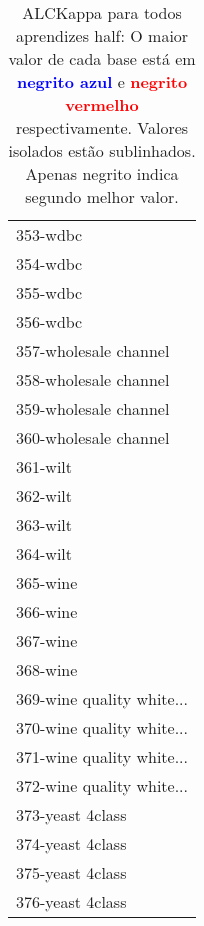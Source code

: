 \begin{table}[h]
\caption{ALCKappa para todos aprendizes half: O maior valor de cada base está em \textcolor{blue}{\textbf{negrito azul}} e \textcolor{red}{\textbf{negrito vermelho}} respectivamente. Valores isolados estão sublinhados. Apenas negrito indica segundo melhor valor.}
\begin{center}\begin{tabular}{l}
 & \\ \hline 353-wdbc &  \\
354-wdbc &  \\
355-wdbc &  \\
356-wdbc &  \\
357-wholesale channel &  \\
358-wholesale channel &  \\
359-wholesale channel &  \\ \hline
360-wholesale channel &  \\
361-wilt &  \\
362-wilt &  \\
363-wilt &  \\
364-wilt &  \\
365-wine &  \\
366-wine &  \\ \hline
367-wine &  \\
368-wine &  \\
369-wine quality white... &  \\
370-wine quality white... &  \\
371-wine quality white... &  \\
372-wine quality white... &  \\
373-yeast 4class &  \\ \hline
374-yeast 4class &  \\
375-yeast 4class &  \\
376-yeast 4class &  \\\end{tabular}\label{stratsALCKappa11AllRedux50b}
\end{center}
\end{table}